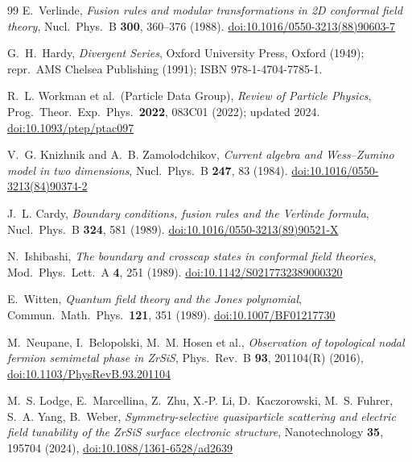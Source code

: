 \documentclass[11pt,a4paper]{article}
\theoremstyle{definition}
\theoremstyle{remark}
\begin{document}
\begin{thebibliography}{99}
E.~Verlinde,
\textit{Fusion rules and modular transformations in 2D conformal field theory},
Nucl.\ Phys.\ B \textbf{300}, 360--376 (1988).
\href{https://doi.org/10.1016/0550-3213(88)90603-7}{doi:10.1016/0550-3213(88)90603-7}

G.~H.~Hardy,
\textit{Divergent Series},
Oxford University Press, Oxford (1949); repr.\ AMS Chelsea Publishing (1991);
ISBN 978-1-4704-7785-1.

R.~L. Workman et al.\ (Particle Data Group),
\textit{Review of Particle Physics},
Prog.\ Theor.\ Exp.\ Phys.\ \textbf{2022}, 083C01 (2022);
updated 2024.
\href{https://doi.org/10.1093/ptep/ptac097}{doi:10.1093/ptep/ptac097}

V.~G. Knizhnik and A.~B. Zamolodchikov,
\textit{Current algebra and Wess--Zumino model in two dimensions},
Nucl.\ Phys.\ B \textbf{247}, 83 (1984).
\href{https://doi.org/10.1016/0550-3213(84)90374-2}{doi:10.1016/0550-3213(84)90374-2}

J.~L. Cardy,
\textit{Boundary conditions, fusion rules and the Verlinde formula},
Nucl.\ Phys.\ B \textbf{324}, 581 (1989).
\href{https://doi.org/10.1016/0550-3213(89)90521-X}{doi:10.1016/0550-3213(89)90521-X}

N.~Ishibashi,
\textit{The boundary and crosscap states in conformal field theories},
Mod.\ Phys.\ Lett.\ A \textbf{4}, 251 (1989).
\href{https://doi.org/10.1142/S0217732389000320}{doi:10.1142/S0217732389000320}

E.~Witten,
\textit{Quantum field theory and the Jones polynomial},
Commun.\ Math.\ Phys.\ \textbf{121}, 351 (1989).
\href{https://doi.org/10.1007/BF01217730}{doi:10.1007/BF01217730}

M.~Neupane, I.~Belopolski, M.~M. Hosen et al.,
\textit{Observation of topological nodal fermion semimetal phase in ZrSiS},
Phys.\ Rev.\ B \textbf{93}, 201104(R) (2016),
\href{https://doi.org/10.1103/PhysRevB.93.201104}{doi:10.1103/PhysRevB.93.201104}

M.~S. Lodge, E.~Marcellina, Z.~Zhu, X.-P. Li, D.~Kaczorowski,
M.~S. Fuhrer, S.~A. Yang, B.~Weber,
\textit{Symmetry-selective quasiparticle scattering and electric field
tunability of the ZrSiS surface electronic structure},
Nanotechnology \textbf{35}, 195704 (2024),
\href{https://doi.org/10.1088/1361-6528/ad2639}{doi:10.1088/1361-6528/ad2639}


\end{thebibliography}
\end{document}
